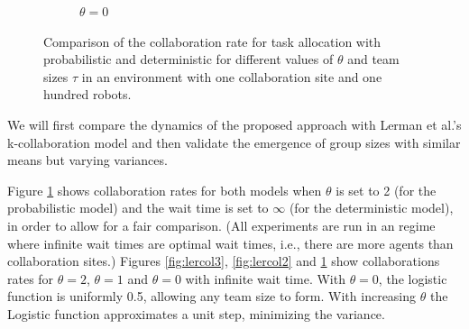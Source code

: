 \documentclass{TeXstyles/DARS/svmult}  %
\begin{document}
\begin{figure}[!htb]
\begin{subfigure}{0.33\textwidth}
\centering\caption{$\theta=0$}\label{fig:lercol1}
\end{subfigure}
\caption{Comparison of the collaboration rate for task allocation with probabilistic and deterministic \cite{Lerman2001} for different values of $\theta$ and team sizes $\tau$ in an environment with one collaboration site and one hundred robots. }\label{fig:lercol}
\end{figure}

We will first compare the dynamics of the proposed approach with Lerman et al.'s k-collaboration model \cite{Lerman2001} and then validate the emergence of group sizes with similar means but varying variances.

Figure \ref{fig:lercol1} shows collaboration rates for both models when $\theta$ is set to 2 (for the probabilistic model) and the wait time is set to $\infty$ (for the deterministic model), in order to allow for a fair comparison. (All experiments are run in an regime where infinite wait times are optimal wait times, i.e., there are more agents than collaboration sites.) Figures \ref{fig:lercol3}, \ref{fig:lercol2} and \ref{fig:lercol1} show collaborations rates for $\theta = 2$, $\theta = 1$ and $\theta=0$ with infinite wait time. With $\theta=0$, the logistic function is uniformly 0.5, allowing any team size to form.  
With increasing $\theta$ the Logistic function approximates a unit step, minimizing the variance. 
\end{document}
